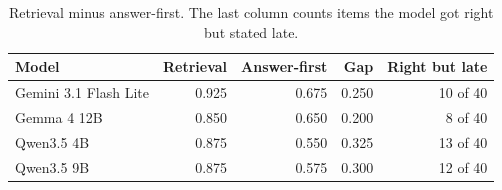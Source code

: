 \begin{table}[htbp]
\centering
\caption{Retrieval minus answer-first. The last column counts items the model got right but stated late.}
\label{tab:gap}
{\small
\begin{tabular}{@{}lrrrr@{}}
\toprule
Model & Retrieval & Answer-first & Gap & Right but late \\
\midrule
Gemini 3.1 Flash Lite & 0.925 & 0.675 & 0.250 & 10 of 40 \\
Gemma 4 12B & 0.850 & 0.650 & 0.200 & 8 of 40 \\
Qwen3.5 4B & 0.875 & 0.550 & 0.325 & 13 of 40 \\
Qwen3.5 9B & 0.875 & 0.575 & 0.300 & 12 of 40 \\
\bottomrule
\end{tabular}}
\end{table}
